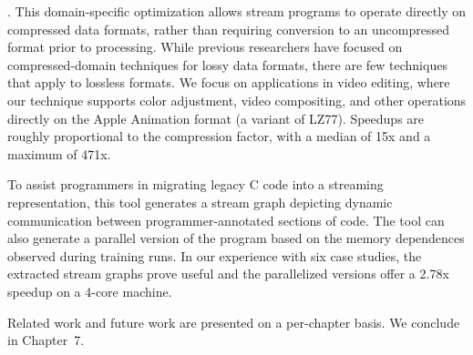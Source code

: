 .  This domain-specific
  optimization allows stream programs to operate directly on
  compressed data formats, rather than requiring conversion to an
  uncompressed format prior to processing.  While previous researchers
  have focused on compressed-domain techniques for lossy data formats,
  there are few techniques that apply to lossless formats.  We focus
  on applications in video editing, where our technique supports color
  adjustment, video compositing, and other operations directly on the
  Apple Animation format (a variant of LZ77).  Speedups are roughly
  proportional to the compression factor, with a median of 15x and a
  maximum of 471x.

  To
  assist programmers in migrating legacy C code into a streaming
  representation, this tool generates a stream graph depicting dynamic
  communication between programmer-annotated sections of code.  The
  tool can also generate a parallel version of the program based on
  the memory dependences observed during training runs.  In our
  experience with six case studies, the extracted stream graphs prove
  useful and the parallelized versions offer a 2.78x speedup on a
  4-core machine.

\myend


\noindent Related work and future work are presented on a per-chapter 
basis.  We conclude in Chapter~7.

